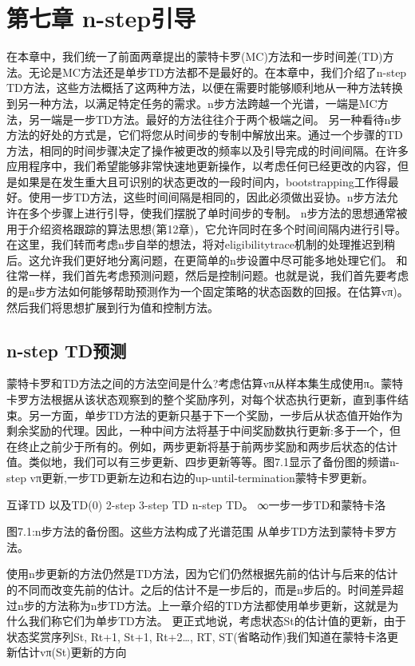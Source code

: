 \chapter{第七章 n-step引导}
在本章中，我们统一了前面两章提出的蒙特卡罗(MC)方法和一步时间差(TD)方法。无论是MC方法还是单步TD方法都不是最好的。在本章中，我们介绍了n-step TD方法，这些方法概括了这两种方法，以便在需要时能够顺利地从一种方法转换到另一种方法，以满足特定任务的需求。n步方法跨越一个光谱，一端是MC方法，另一端是一步TD方法。最好的方法往往介于两个极端之间。
另一种看待n步方法的好处的方式是，它们将您从时间步的专制中解放出来。通过一个步骤的TD方法，相同的时间步骤决定了操作被更改的频率以及引导完成的时间间隔。在许多应用程序中，我们希望能够非常快速地更新操作，以考虑任何已经更改的内容，但是如果是在发生重大且可识别的状态更改的一段时间内，bootstrapping工作得最好。使用一步TD方法，这些时间间隔是相同的，因此必须做出妥协。n步方法允许在多个步骤上进行引导，使我们摆脱了单时间步的专制。
n步方法的思想通常被用于介绍资格跟踪的算法思想(第12章)，它允许同时在多个时间间隔内进行引导。在这里，我们转而考虑n步自举的想法，将对eligibilitytrace机制的处理推迟到稍后。这允许我们更好地分离问题，在更简单的n步设置中尽可能多地处理它们。
和往常一样，我们首先考虑预测问题，然后是控制问题。也就是说，我们首先要考虑的是n步方法如何能够帮助预测作为一个固定策略的状态函数的回报。在估算vπ)。然后我们将思想扩展到行为值和控制方法。

\section{n-step TD预测}

蒙特卡罗和TD方法之间的方法空间是什么?考虑估算vπ从样本集生成使用π。蒙特卡罗方法根据从该状态观察到的整个奖励序列，对每个状态执行更新，直到事件结束。另一方面，单步TD方法的更新只基于下一个奖励，一步后从状态值开始作为剩余奖励的代理。因此，一种中间方法将基于中间奖励数执行更新:多于一个，但在终止之前少于所有的。例如，两步更新将基于前两步奖励和两步后状态的估计值。类似地，我们可以有三步更新、四步更新等等。图7.1显示了备份图的频谱n-step vπ更新,一步TD更新左边和右边的up-until-termination蒙特卡罗更新。


互译TD
以及TD(0) 2-step 3-step TD n-step TD。
∞一步一步TD和蒙特卡洛
 

图7.1:n步方法的备份图。这些方法构成了光谱范围
从单步TD方法到蒙特卡罗方法。


使用n步更新的方法仍然是TD方法，因为它们仍然根据先前的估计与后来的估计的不同而改变先前的估计。之后的估计不是一步后的，而是n步后的。时间差异超过n步的方法称为n步TD方法。上一章介绍的TD方法都使用单步更新，这就是为什么我们称它们为单步TD方法。
更正式地说，考虑状态St的估计值的更新，由于状态奖赏序列St, Rt+1, St+1, Rt+2…, RT, ST(省略动作)我们知道在蒙特卡洛更新估计vπ(St)更新的方向

